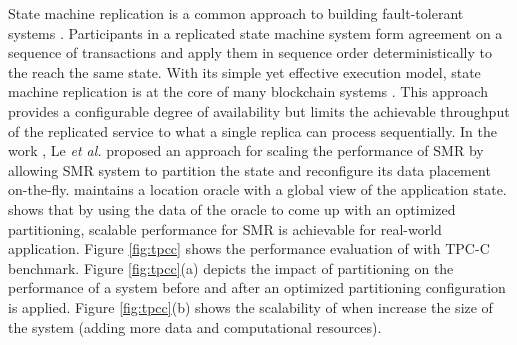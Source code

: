 State machine replication is a common approach to building fault-tolerant
systems \cite{Lam78, Sch90}. Participants in a replicated state machine system
form agreement on a sequence of transactions and apply them in sequence order
deterministically to the reach the same state. With its simple yet effective
execution model, state machine replication is at the core of many blockchain
systems \cite{baudet2019state, cachin2016architecture}. This approach provides a
configurable degree of availability but limits the achievable throughput of the
replicated service to what a single replica can process sequentially. In the
work \dynastar \cite{le2019dynastar}, Le \emph{et al.} proposed an approach for
scaling the performance of SMR by allowing SMR system to partition the state and
reconfigure its data placement on-the-fly. \dynastar maintains a location oracle
with a global view of the application state. \dynastar shows that by using the
data of the oracle to come up with an optimized partitioning, scalable
performance for SMR is achievable for real-world application. Figure
\ref{fig:tpcc} shows the performance evaluation of \dynastar with TPC-C
benchmark. Figure \ref{fig:tpcc}(a) depicts the impact of partitioning on the
performance of a system before and after an optimized partitioning configuration
is applied. Figure \ref{fig:tpcc}(b) shows the scalability of \dynastar when
increase the size of the system (adding more data and computational resources). 

